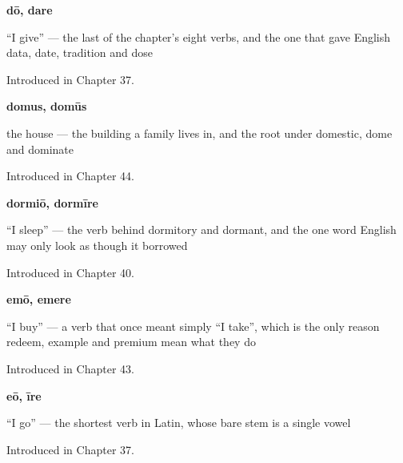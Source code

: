 \noindent\begin{minipage}[t]{\linewidth}
\raggedright
\textbf{dō, dare}\par
\small \textquotedblleft{}I give\textquotedblright{} — the last of the chapter's eight verbs, and the one that gave English data, date, tradition and dose\par
\footnotesize Introduced in Chapter 37.
\end{minipage}\par\medskip

\noindent\begin{minipage}[t]{\linewidth}
\raggedright
\textbf{domus, domūs}\par
\small the house — the building a family lives in, and the root under domestic, dome and dominate\par
\footnotesize Introduced in Chapter 44.
\end{minipage}\par\medskip

\noindent\begin{minipage}[t]{\linewidth}
\raggedright
\textbf{dormiō, dormīre}\par
\small \textquotedblleft{}I sleep\textquotedblright{} — the verb behind dormitory and dormant, and the one word English may only look as though it borrowed\par
\footnotesize Introduced in Chapter 40.
\end{minipage}\par\medskip

\noindent\begin{minipage}[t]{\linewidth}
\raggedright
\textbf{emō, emere}\par
\small \textquotedblleft{}I buy\textquotedblright{} — a verb that once meant simply \textquotedblleft{}I take\textquotedblright{}, which is the only reason redeem, example and premium mean what they do\par
\footnotesize Introduced in Chapter 43.
\end{minipage}\par\medskip

\noindent\begin{minipage}[t]{\linewidth}
\raggedright
\textbf{eō, īre}\par
\small \textquotedblleft{}I go\textquotedblright{} — the shortest verb in Latin, whose bare stem is a single vowel\par
\footnotesize Introduced in Chapter 37.
\end{minipage}\par\medskip

